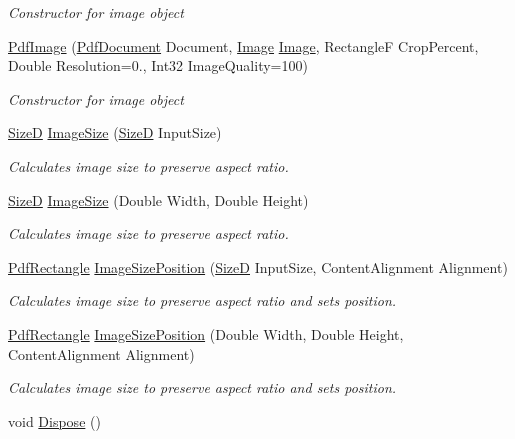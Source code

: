 \begin{DoxyCompactItemize}
\begin{DoxyCompactList}\small\item\em Constructor for image object \end{DoxyCompactList}\item 
\hyperlink{class_pdf_file_writer_1_1_pdf_image_a7578b95df51b1c8dcb1a43c40ba65951}{Pdf\+Image} (\hyperlink{class_pdf_file_writer_1_1_pdf_document}{Pdf\+Document} Document, \hyperlink{namespace_pdf_file_writer_a45e52c090a4d8e1333577773ec0bac4aabe53a0541a6d36f6ecb879fa2c584b08}{Image} \hyperlink{namespace_pdf_file_writer_a45e52c090a4d8e1333577773ec0bac4aabe53a0541a6d36f6ecb879fa2c584b08}{Image}, RectangleF Crop\+Percent, Double Resolution=0., Int32 Image\+Quality=100)
\begin{DoxyCompactList}\small\item\em Constructor for image object \end{DoxyCompactList}\item 
\hyperlink{class_pdf_file_writer_1_1_size_d}{SizeD} \hyperlink{class_pdf_file_writer_1_1_pdf_image_acb99af8787eda8a0d2e0731fff6ca041}{Image\+Size} (\hyperlink{class_pdf_file_writer_1_1_size_d}{SizeD} Input\+Size)
\begin{DoxyCompactList}\small\item\em Calculates image size to preserve aspect ratio. \end{DoxyCompactList}\item 
\hyperlink{class_pdf_file_writer_1_1_size_d}{SizeD} \hyperlink{class_pdf_file_writer_1_1_pdf_image_a959678c59c27ebb24fc6508d11e618d9}{Image\+Size} (Double Width, Double Height)
\begin{DoxyCompactList}\small\item\em Calculates image size to preserve aspect ratio. \end{DoxyCompactList}\item 
\hyperlink{class_pdf_file_writer_1_1_pdf_rectangle}{Pdf\+Rectangle} \hyperlink{class_pdf_file_writer_1_1_pdf_image_a4b8229b02152f91f049c79800ffb1040}{Image\+Size\+Position} (\hyperlink{class_pdf_file_writer_1_1_size_d}{SizeD} Input\+Size, Content\+Alignment Alignment)
\begin{DoxyCompactList}\small\item\em Calculates image size to preserve aspect ratio and sets position. \end{DoxyCompactList}\item 
\hyperlink{class_pdf_file_writer_1_1_pdf_rectangle}{Pdf\+Rectangle} \hyperlink{class_pdf_file_writer_1_1_pdf_image_ae39efb37cf7dc1e34431b272e6577dab}{Image\+Size\+Position} (Double Width, Double Height, Content\+Alignment Alignment)
\begin{DoxyCompactList}\small\item\em Calculates image size to preserve aspect ratio and sets position. \end{DoxyCompactList}\item 
void \hyperlink{class_pdf_file_writer_1_1_pdf_image_a9646051cad8c04bfe178d7ee3b96971c}{Dispose} ()\hypertarget{class_pdf_file_writer_1_1_pdf_image_a9646051cad8c04bfe178d7ee3b96971c}{}\label{class_pdf_file_writer_1_1_pdf_image_a9646051cad8c04bfe178d7ee3b96971c}


\end{DoxyCompactItemize}
